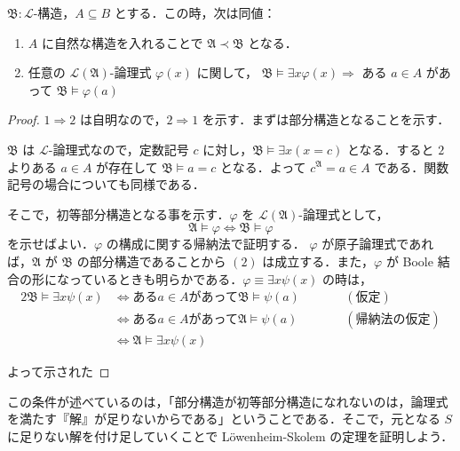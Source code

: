 \documentclass[a4j,xelatex,ja=standard]{ltjsarticle}
\begin{document}
\begin{lemma}
 $\mathfrak{B}: \mathcal{L}$-構造，$A \subseteq B$ とする．この時，次は同値：
 \begin{enumerate}
  \item $A$ に自然な構造を入れることで $\mathfrak{A} \prec \mathfrak{B}$ となる．
  \item 任意の $\mathcal{L}(\mathfrak{A})$-論理式 $\varphi(x)$ に関して，
	 $\mathfrak{B} \models \exists x \varphi(x) \Longrightarrow$ ある $a \in A$ があって $\mathfrak{B} \models \varphi(a)$
 \end{enumerate}
\end{lemma}
\begin{proof}
 $1 \Longrightarrow 2$ は自明なので，$2 \Longrightarrow 1$ を示す．まずは部分構造となることを示す．
 
 $\mathfrak{B}$ は $\mathcal{L}$-論理式なので，定数記号 $c$ に対し，$\mathfrak{B} \models \exists x (x = c)$ となる．すると $2$ よりある $a \in A$ が存在して $\mathfrak{B} \models a = c$ となる．よって $c^\mathfrak{A} = a \in A$ である．関数記号の場合についても同様である．

 そこで，初等部分構造となる事を示す．$\varphi$ を $\mathcal{L}(\mathfrak{A})$-論理式として，
 \begin{equation}
  \mathfrak{A} \models \varphi \Leftrightarrow \mathfrak{B} \models \varphi\label{eqn:elementary}
 \end{equation} 
を示せばよい．$\varphi$ の構成に関する帰納法で証明する．
 $\varphi$ が原子論理式であれば，$\mathfrak{A}$ が $\mathfrak{B}$ の部分構造であることから $(2)$ は成立する．また，$\varphi$ が Boole 結合の形になっているときも明らかである．$\varphi \equiv \exists x \psi(x)$ の時は，
 \begin{alignat*}{2}
  \mathfrak{B} \models \exists x \psi(x) &\Leftrightarrow \text{ある} a \in A \text{があって} \mathfrak{B} \models \psi(a) &\qquad& (\text{仮定})\\
  & \Leftrightarrow \text{ある} a \in A \text{があって} \mathfrak{A} \models \psi(a) && (\text{帰納法の仮定}) \\
  & \Leftrightarrow \mathfrak{A} \models \exists x \psi(x)
 \end{alignat*}

 よって示された\mbox{}
\end{proof}

この条件が述べているのは，「部分構造が初等部分構造になれないのは，論理式を満たす『解』が足りないからである」ということである．そこで，元となる $S$ に足りない解を付け足していくことで L\"{o}wenheim-Skolem の定理を証明しよう．
\end{document}
